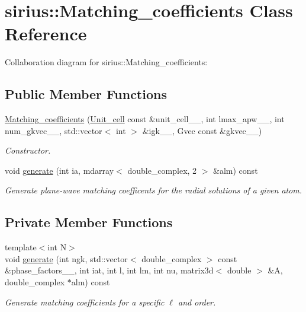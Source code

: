 \hypertarget{classsirius_1_1_matching__coefficients}{}\section{sirius\+:\+:Matching\+\_\+coefficients Class Reference}
\label{classsirius_1_1_matching__coefficients}


Collaboration diagram for sirius\+:\+:Matching\+\_\+coefficients\+:
\subsection*{Public Member Functions}
\begin{DoxyCompactItemize}
\item 
\hyperlink{classsirius_1_1_matching__coefficients_a624fedd2d619135cb119b9a720365739}{Matching\+\_\+coefficients} (\hyperlink{classsirius_1_1_unit__cell}{Unit\+\_\+cell} const \&unit\+\_\+cell\+\_\+\+\_\+, int lmax\+\_\+apw\+\_\+\+\_\+, int num\+\_\+gkvec\+\_\+\+\_\+, std\+::vector$<$ int $>$ \&igk\+\_\+\+\_\+, Gvec const \&gkvec\+\_\+\+\_\+)
\begin{DoxyCompactList}\small\item\em Constructor. \end{DoxyCompactList}\item 
void \hyperlink{classsirius_1_1_matching__coefficients_abf94081b974ce514b1469f3204f97c78}{generate} (int ia, mdarray$<$ double\+\_\+complex, 2 $>$ \&alm) const 
\begin{DoxyCompactList}\small\item\em Generate plane-\/wave matching coefficents for the radial solutions of a given atom. \end{DoxyCompactList}\end{DoxyCompactItemize}
\subsection*{Private Member Functions}
\begin{DoxyCompactItemize}
\item 
{\footnotesize template$<$int N$>$ }\\void \hyperlink{classsirius_1_1_matching__coefficients_aa36f0271db29770ef968541cc4cc2cb5}{generate} (int ngk, std\+::vector$<$ double\+\_\+complex $>$ const \&phase\+\_\+factors\+\_\+\+\_\+, int iat, int l, int lm, int nu, matrix3d$<$ double $>$ \&A, double\+\_\+complex $\ast$alm) const 
\begin{DoxyCompactList}\small\item\em Generate matching coefficients for a specific $ \ell $ and order. \end{DoxyCompactList}\end{DoxyCompactItemize}
